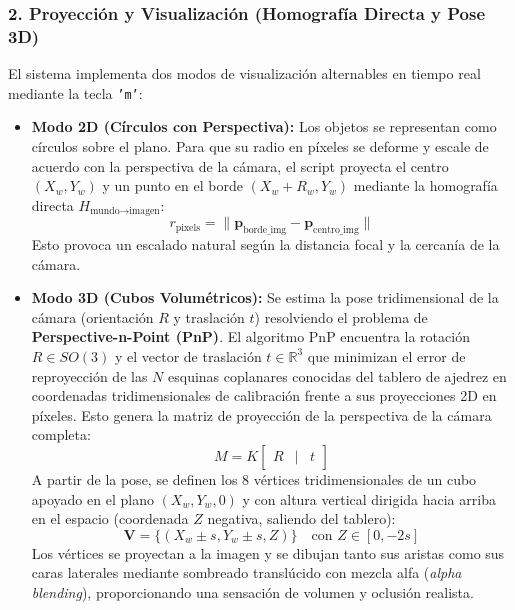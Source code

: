 \documentclass[12pt,a4paper]{article}
\begin{document}
\subsubsection*{2. Proyección y Visualización (Homografía Directa y Pose 3D)}
El sistema implementa dos modos de visualización alternables en tiempo real mediante la tecla \texttt{'m'}:
\begin{itemize}
    \item \textbf{Modo 2D (Círculos con Perspectiva):} Los objetos se representan como círculos sobre el plano. Para que su radio en píxeles se deforme y escale de acuerdo con la perspectiva de la cámara, el script proyecta el centro $(X_w, Y_w)$ y un punto en el borde $(X_w + R_w, Y_w)$ mediante la homografía directa $H_{\text{mundo} \to \text{imagen}}$:
    \begin{equation}
        r_{\text{pixels}} = \| \mathbf{p}_{\text{borde\_img}} - \mathbf{p}_{\text{centro\_img}} \|
    \end{equation}
    Esto provoca un escalado natural según la distancia focal y la cercanía de la cámara.
    
    \item \textbf{Modo 3D (Cubos Volumétricos):} Se estima la pose tridimensional de la cámara (orientación $R$ y traslación $t$) resolviendo el problema de \textbf{Perspective-n-Point (PnP)}. El algoritmo PnP encuentra la rotación $R \in SO(3)$ y el vector de traslación $t \in \mathbb{R}^3$ que minimizan el error de reproyección de las $N$ esquinas coplanares conocidas del tablero de ajedrez en coordenadas tridimensionales de calibración frente a sus proyecciones 2D en píxeles. Esto genera la matriz de proyección de la perspectiva de la cámara completa:
    \begin{equation}
        M = K \begin{bmatrix} R & | & t \end{bmatrix}
    \end{equation}
    A partir de la pose, se definen los 8 vértices tridimensionales de un cubo apoyado en el plano $(X_w, Y_w, 0)$ y con altura vertical dirigida hacia arriba en el espacio (coordenada $Z$ negativa, saliendo del tablero):
    \begin{equation}
        \mathbf{V} = \{ (X_w \pm s, Y_w \pm s, Z) \} \quad \text{con } Z \in [0, -2s]
    \end{equation}
    Los vértices se proyectan a la imagen y se dibujan tanto sus aristas como sus caras laterales mediante sombreado translúcido con mezcla alfa (\textit{alpha blending}), proporcionando una sensación de volumen y oclusión realista.
\end{itemize}
\end{document}
